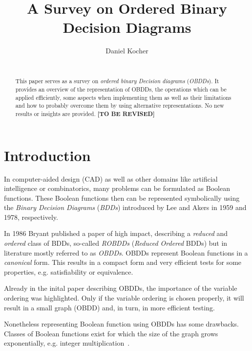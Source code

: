 \documentclass{vldb}
\newcommand{\tbr}{\textbf{[TO BE REVISED]}}
\begin{document}
\title{A Survey on Ordered Binary Decision Diagrams}


\author{
\alignauthor
	Daniel Kocher\\
    \\
}

\maketitle

\begin{abstract}
This paper serves as a survey on \textit{ordered binary Decision diagrams}
(\textit{OBDDs}). It provides an overview of the representation of OBDDs, the
operations which can be applied efficiently, some aspects when implementing them
as well as their limitations and how to probably overcome them by using
alternative representations. No new results or insights are provided.
\tbr
\end{abstract}

\section{Introduction}
\label{sec:introduction}

In computer-aided design (CAD) as well as other domains like artificial
intelligence or combinatorics, many problems can be formulated as Boolean
functions. These Boolean functions then can be represented symbolically using the
\textit{Binary Decision Diagrams} (\textit{BDDs}) introduced by Lee\cite{LEE59}
and Akers\cite{AKERS78} in 1959 and 1978, respectively.

In 1986 Bryant\cite{BRYANT86} published a paper of high impact, describing a
\textit{reduced} and \textit{ordered} class of BDDs, so-called \textit{ROBDDs}
(\textit{Reduced Ordered} BDDs) but in literature mostly referred to as
\textit{OBDDs}. OBDDs represent Boolean functions in a \textit{canonical}
form. This results in a compact form and very efficient tests for some properties,
e.g. satisfiability or equivalence\cite{BRYANT86}.

Already in the inital paper describing OBDDs, the importance of the variable
ordering was highlighted. Only if the variable ordering is chosen properly, it
will result in a small graph (OBDD) and, in turn, in more efficient testing.

Nonetheless representing Boolean function using OBDDs has some drawbacks. Classes
of Boolean functions exist for which the size of the graph grows exponentially,
e.g. integer multiplication~\cite{BRYANT86, BRYANT91, WOELFEL01}.
\end{document}
